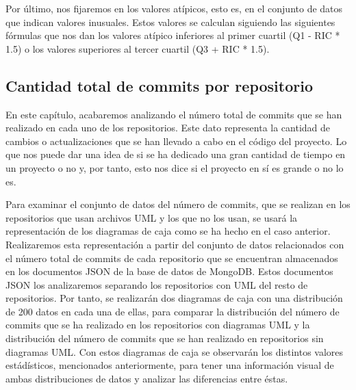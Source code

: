 \documentclass[a4paper, 12pt]{book}
\begin{document}
Por último, nos fijaremos en los valores atípicos, esto es, en el conjunto de datos que indican valores inusuales.
Estos valores se calculan siguiendo las siguientes fórmulas que nos dan los valores atípico inferiores al primer cuartil (Q1 - RIC * 1.5)  o los valores superiores al tercer cuartil (Q3 + RIC * 1.5). 



\subsection{Cantidad total de commits por repositorio} %
\label{sec:cantidad total de commits por repositorio}

En este capítulo, acabaremos analizando el número total de commits que se han realizado en cada uno de los repositorios.
Este dato representa la cantidad de cambios o actualizaciones que se han llevado a cabo en el código del proyecto.
Lo que nos puede dar una idea de si se ha dedicado una gran cantidad de tiempo en un proyecto o no y, por tanto, esto nos dice si el proyecto en sí es grande o no lo es. 


Para examinar el conjunto de datos del número de commits, que se realizan en los repositorios que usan archivos UML y los que no los usan, se usará la representación de  los diagramas de caja como se ha hecho en el caso anterior.
Realizaremos esta representación a partir del conjunto de datos relacionados con el número total de commits de cada repositorio que se encuentran almacenados en los documentos JSON de la base de datos de MongoDB.
Estos documentos JSON los analizaremos separando los repositorios con UML del resto de repositorios. 
Por tanto, se realizarán dos diagramas de caja con una distribución de 200 datos en cada una de ellas, para comparar la distribución del número de commits que se ha realizado en los repositorios con diagramas UML y la distribución del número de commits que se han realizado en repositorios sin diagramas UML.
Con estos diagramas de caja se observarán los distintos valores estádísticos, mencionados anteriormente, para tener una información visual de ambas distribuciones de datos y analizar las diferencias entre éstas.  


\end{document}
